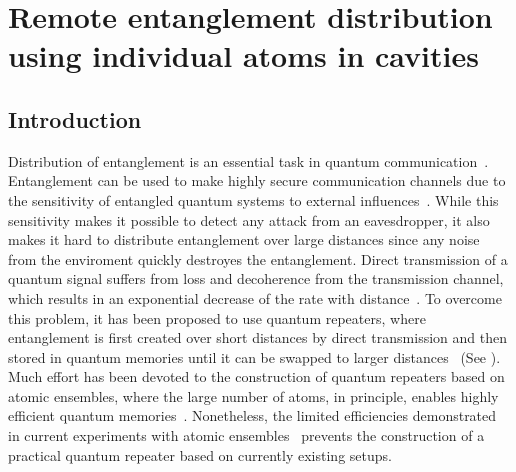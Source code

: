 \chapter{Remote entanglement distribution using individual atoms in
cavities}
\label{ch:Borregaard_PRA2015}
 

\section{Introduction}

Distribution of entanglement is an essential task in quantum
communication~\cite{kimble,cirac, acin}.  Entanglement can be used to make
highly secure communication channels due to the sensitivity of entangled quantum
systems to external influences~\cite{scarani}. While this sensitivity makes it
possible to detect any attack from an eavesdropper, it also makes it hard to
distribute entanglement over large distances since any noise from the enviroment
quickly destroyes the entanglement. Direct transmission of a quantum signal
suffers from loss and decoherence from the transmission channel, which results
in an exponential decrease of the rate with distance~\cite{briegel}. To overcome
this problem, it has been proposed to use quantum repeaters, where entanglement
is first created over short distances by direct transmission and then stored in
quantum memories until it can be swapped to larger
distances~\cite{briegel,duan3} (See ). Much effort has been
devoted to the construction of quantum repeaters based on atomic ensembles,
where the large number of atoms, in principle, enables highly efficient quantum
memories~\cite{sangouard3,cell}. Nonetheless, the limited efficiencies
demonstrated in current experiments with atomic
ensembles~\cite{sangouard3,hammerer} prevents the construction of a practical
quantum repeater based on currently existing setups.

